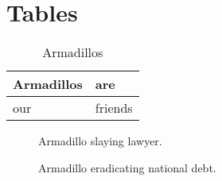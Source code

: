 \chapter{Tables}

\begin{table}
\caption{Armadillos}
\label{arm:table}
\begin{center}
\begin{tabular}{||l|l||}\hline
Armadillos & are \\\hline
our	   & friends \\\hline
\end{tabular}
\end{center}
\end{table}

\clearpage
\newpage

\begin{figure}
\vspace{2.4in}
\caption{Armadillo slaying lawyer.}
\label{arm:fig1}
\end{figure}

\clearpage
\newpage

\begin{figure}
\vspace{2.4in}
\caption{Armadillo eradicating national debt.}
\label{arm:fig2}
\end{figure}

\clearpage
\newpage
